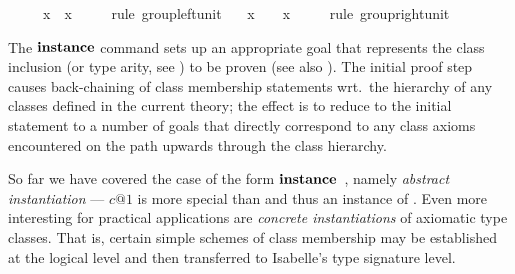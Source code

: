 \begin{isabellebody}
\ \ \ {\isachardoublequote}{\isasymunit}\ {\isasymodot}\ x\ {\isacharequal}\ x{\isachardoublequote}\isanewline
\ \ \ \ \ {\isacharparenleft}rule\ group{\isachardot}left{\isacharunderscore}unit{\isacharparenright}\isanewline
\ \ \ {\isachardoublequote}x\ {\isasymodot}\ {\isasymunit}\ {\isacharequal}\ x{\isachardoublequote}\isanewline
\ \ \ \ \ {\isacharparenleft}rule\ group{\isacharunderscore}right{\isacharunderscore}unit{\isacharparenright}\isanewline
{}%
\begin{isamarkuptext}%
\medskip The ${\mathord{\mathbf{instance}}}$ command sets up an appropriate goal that
 represents the class inclusion (or type arity, see
 ) to be proven (see also
 \cite{isabelle-isar-ref}).  The initial proof step causes
 back-chaining of class membership statements wrt.\ the hierarchy of
 any classes defined in the current theory; the effect is to reduce to
 the initial statement to a number of goals that directly correspond
 to any class axioms encountered on the path upwards through the class
 hierarchy.%
\end{isamarkuptext}%
%
%
\begin{isamarkuptext}%
So far we have covered the case of the form ${\mathord{\mathbf{instance}}}$~, namely \emph{abstract instantiation} ---
 $c@1$ is more special than  and thus an instance
 of .  Even more interesting for practical
 applications are \emph{concrete instantiations} of axiomatic type
 classes.  That is, certain simple schemes  of class membership may be established at the
 logical level and then transferred to Isabelle's type signature
 level.


\end{isamarkuptext}
\end{isabellebody}
